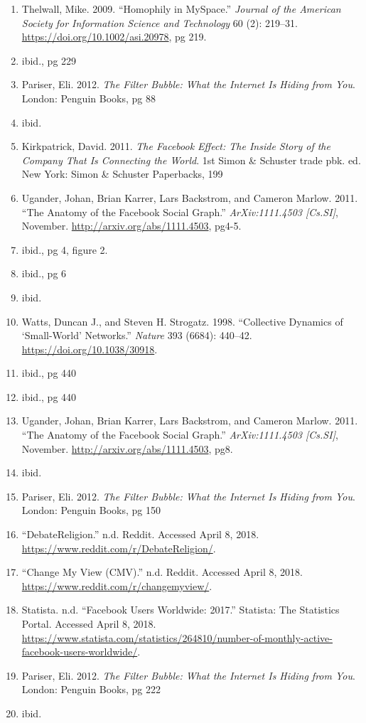 \documentclass[]{article}
\providecommand{\tightlist}{%
  \setlength{\itemsep}{0pt}\setlength{\parskip}{0pt}}
\begin{document}
\begin{enumerate}
\def\labelenumi{\arabic{enumi}.}
\setcounter{enumi}{20}
\tightlist
\item
  Thelwall, Mike. 2009. ``Homophily in MySpace.'' \emph{Journal of the
  American Society for Information Science and Technology} 60 (2):
  219--31. \url{https://doi.org/10.1002/asi.20978}, pg 219.
\item
  ibid., pg 229
\item
  Pariser, Eli. 2012. \emph{The Filter Bubble: What the Internet Is
  Hiding from You}. London: Penguin Books, pg 88
\item
  ibid.
\item
  Kirkpatrick, David. 2011. \emph{The Facebook Effect: The Inside Story
  of the Company That Is Connecting the World}. 1st Simon \& Schuster
  trade pbk. ed. New York: Simon \& Schuster Paperbacks, 199
\item
  Ugander, Johan, Brian Karrer, Lars Backstrom, and Cameron Marlow.
  2011. ``The Anatomy of the Facebook Social Graph.''
  \emph{ArXiv:1111.4503 {[}Cs.SI{]}}, November.
  \url{http://arxiv.org/abs/1111.4503}, pg4-5.
\item
  ibid., pg 4, figure 2.
\item
  ibid., pg 6
\item
  ibid.
\item
  Watts, Duncan J., and Steven H. Strogatz. 1998. ``Collective Dynamics
  of `Small-World' Networks.'' \emph{Nature} 393 (6684): 440--42.
  \url{https://doi.org/10.1038/30918}.
\item
  ibid., pg 440
\item
  ibid., pg 440
\item
  Ugander, Johan, Brian Karrer, Lars Backstrom, and Cameron Marlow.
  2011. ``The Anatomy of the Facebook Social Graph.''
  \emph{ArXiv:1111.4503 {[}Cs.SI{]}}, November.
  \url{http://arxiv.org/abs/1111.4503}, pg8.
\item
  ibid.
\item
  Pariser, Eli. 2012. \emph{The Filter Bubble: What the Internet Is
  Hiding from You}. London: Penguin Books, pg 150
\item
  ``DebateReligion.'' n.d. Reddit. Accessed April 8, 2018.
  \url{https://www.reddit.com/r/DebateReligion/}.
\item
  ``Change My View (CMV).'' n.d. Reddit. Accessed April 8, 2018.
  \url{https://www.reddit.com/r/changemyview/}.
\item
  Statista. n.d. ``Facebook Users Worldwide: 2017.'' Statista: The
  Statistics Portal. Accessed April 8, 2018.
  \url{https://www.statista.com/statistics/264810/number-of-monthly-active-facebook-users-worldwide/}.
\item
  Pariser, Eli. 2012. \emph{The Filter Bubble: What the Internet Is
  Hiding from You}. London: Penguin Books, pg 222
\item
  ibid.
\end{enumerate}
\end{document}
